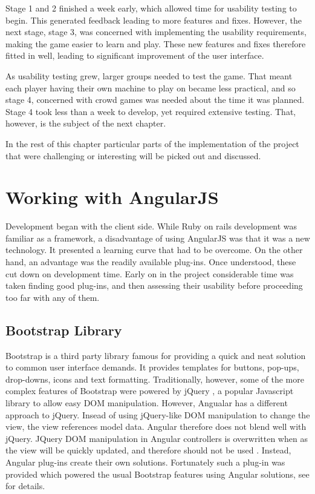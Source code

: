 Stage 1 and 2 finished a week early, which allowed time for usability testing to begin. This generated feedback leading to more features and fixes. However, the next stage, stage 3, was concerned with implementing the usability requirements, making the game easier to learn and play. These new features and fixes therefore fitted in well, leading to significant improvement of the user interface.

As usability testing grew, larger groups needed to test the game. That meant each player having their own machine to play on became less practical, and so stage 4, concerned with crowd games was needed about the time it was planned. Stage 4 took less than a week to develop, yet required extensive testing. That, however, is the subject of the next chapter.

In the rest of this chapter particular parts of the implementation of the project that were challenging or interesting will be picked out and discussed.

\section{Working with AngularJS}
Development began with the client side. While Ruby on rails development was familiar as a framework, a disadvantage of using AngularJS was that it was a new technology. It presented a learning curve that had to be overcome. On the other hand, an advantage was the readily available plug-ins. Once understood, these cut down on development time. Early on in the project considerable time was taken finding good plug-ins, and then assessing their usability before proceeding too far with any of them.

\subsection{Bootstrap Library}
Bootstrap is a third party library famous for providing a quick and neat solution to common user interface demands. It provides templates for buttons, pop-ups, drop-downs, icons and text formatting. Traditionally, however, some of the more complex features of Bootstrap were powered by jQuery \cite{jQuery}, a popular Javascript library to allow easy DOM manipulation. However, Angualar has a different approach to jQuery. Insead of using jQuery-like DOM manipulation to change the view, the view references model data. Angular therefore does not blend well with jQuery. JQuery DOM manipulation in Angular controllers is overwritten when as the view will be quickly updated, and therefore should not be used \cite{AngularOverBB}. Instead, Angular plug-ins create their own solutions. Fortunately such a plug-in was provided which powered the usual Bootstrap features using Angular solutions, see \cite{AngularBootstrap} for details.

